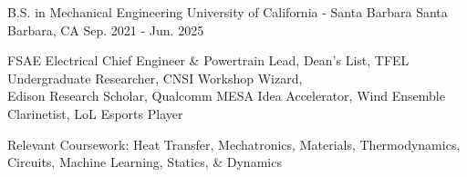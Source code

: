 


\begin{cventries}

\cventry
{B.S. in Mechanical Engineering} %
{University of California - Santa Barbara} %
{Santa Barbara, CA} %
{Sep. 2021 - Jun. 2025} %
{ %
\begin{cvitems}
\item {FSAE Electrical Chief Engineer \& Powertrain Lead, Dean's List, TFEL Undergraduate Researcher, CNSI Workshop Wizard,  \\ Edison Research Scholar, Qualcomm MESA Idea Accelerator,  Wind Ensemble Clarinetist, LoL Esports Player}
\item {Relevant Coursework: Heat Transfer, Mechatronics, Materials, Thermodynamics, Circuits, Machine Learning, Statics, \& Dynamics}
\end{cvitems}
}





\end{cventries}